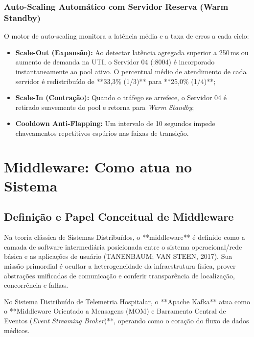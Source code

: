 \documentclass[12pt,a4paper]{article}
\begin{document}
\subsubsection{Auto-Scaling Automático com Servidor Reserva (Warm Standby)}
O motor de auto-scaling monitora a latência média e a taxa de erros a cada ciclo:
\begin{itemize}
	\item \textbf{Scale-Out (Expansão):} Ao detectar latência agregada superior a 250\,ms ou aumento de demanda na UTI, o Servidor 04 (:8004) é incorporado instantaneamente ao pool ativo. O percentual médio de atendimento de cada servidor é redistribuído de **33,3\% (1/3)** para **25,0\% (1/4)**;
	\item \textbf{Scale-In (Contração):} Quando o tráfego se arrefece, o Servidor 04 é retirado suavemente do pool e retorna para \textit{Warm Standby};
	\item \textbf{Cooldown Anti-Flapping:} Um intervalo de 10 segundos impede chaveamentos repetitivos espúrios nas faixas de transição.
\end{itemize}

\newpage

\section{Middleware: Como atua no Sistema}
\label{sec:middleware}

\subsection{Definição e Papel Conceitual de Middleware}
Na teoria clássica de Sistemas Distribuídos, o **middleware** é definido como a camada de software intermediária posicionada entre o sistema operacional/rede básica e as aplicações de usuário (TANENBAUM; VAN STEEN, 2017). Sua missão primordial é ocultar a heterogeneidade da infraestrutura física, prover abstrações unificadas de comunicação e conferir transparência de localização, concorrência e falhas.

No Sistema Distribuído de Telemetria Hospitalar, o **Apache Kafka** atua como o **Middleware Orientado a Mensagens (MOM) e Barramento Central de Eventos (\textit{Event Streaming Broker})**, operando como o coração do fluxo de dados médicos.
\end{document}
